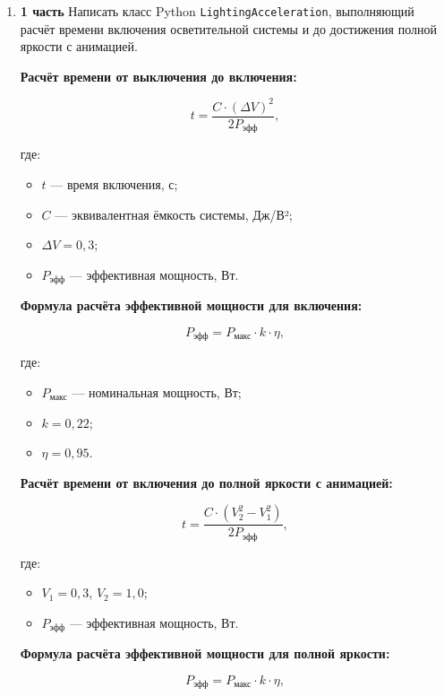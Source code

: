 \begin{enumerate}
\item[30] \textbf{1 часть}  
Написать класс Python \texttt{LightingAcceleration}, выполняющий расчёт времени включения осветительной системы и до достижения полной яркости с анимацией.

\textbf{Расчёт времени от выключения до включения:}

\begin{equation}
t = \frac{C \cdot (\Delta V)^2}{2P_{\text{эфф}}},
\end{equation}

где:  
\begin{itemize}
    \item $t$ — время включения, с;  
    \item $C$ — эквивалентная ёмкость системы, Дж/В²;  
    \item $\Delta V = 0{,}3$;  
    \item $P_{\text{эфф}}$ — эффективная мощность, Вт.  
\end{itemize}

\textbf{Формула расчёта эффективной мощности для включения:}

\begin{equation}
P_{\text{эфф}} = P_{\text{макс}} \cdot k \cdot \eta,
\end{equation}

где:  
\begin{itemize}
    \item $P_{\text{макс}}$ — номинальная мощность, Вт;  
    \item $k = 0{,}22$;  
    \item $\eta = 0{,}95$.  
\end{itemize}

\textbf{Расчёт времени от включения до полной яркости с анимацией:}

\begin{equation}
t = \frac{C \cdot (V_2^2 - V_1^2)}{2P_{\text{эфф}}},
\end{equation}

где:  
\begin{itemize}
    \item $V_1 = 0{,}3$, $V_2 = 1{,}0$;  
    \item $P_{\text{эфф}}$ — эффективная мощность, Вт.  
\end{itemize}

\textbf{Формула расчёта эффективной мощности для полной яркости:}

\begin{equation}
P_{\text{эфф}} = P_{\text{макс}} \cdot k \cdot \eta,
\end{equation}


\end{enumerate}
